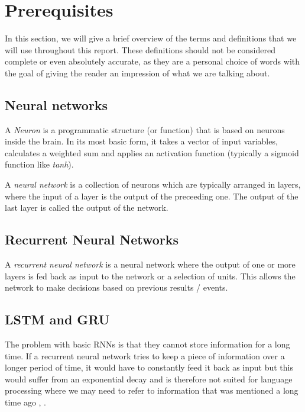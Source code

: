 \section{Prerequisites}
\label{sec:prerequisites}

  In this section, we will give a brief overview of the terms and definitions
  that we will use throughout this report. These definitions should not be
  considered complete or even absolutely accurate, as they are a personal
  choice of words with the goal of giving the reader an impression of what
  we are talking about.

  \subsection{Neural networks}
  \label{sub:neural_networks}
  
    A \textit{Neuron} is a programmatic structure (or function) that is based
    on neurons inside the brain. In its most basic form, it takes a vector of
    input variables, calculates a weighted sum and applies an activation function
    (typically a sigmoid function like \textit{tanh}).

    A \textit{neural network} is a collection of neurons which are typically
    arranged in layers, where the input of a layer is the output of the
    preceeding one. The output of the last layer is called the output of
    the network.

  \subsection{Recurrent Neural Networks}
  \label{sub:recurrent_neural_networks}
  
    A \textit{recurrent neural network} is a neural network where the
    output of one or more layers is fed back as input to the network
    or a selection of units. This allows the network to make decisions
    based on previous results / events.

  \subsection{LSTM and GRU}
  \label{sub:lstm_and_gru}
  
    The problem with basic RNNs is that they cannot store information for a long time.
    If a recurrent neural network tries to keep a piece of information over a longer
    period of time, it would have to constantly feed it back as input but this would
    suffer from an exponential decay and is therefore not suited for language processing
    where we may need to refer to information that was mentioned a long time ago \cite{hrdipl}, \cite{bengio}.

